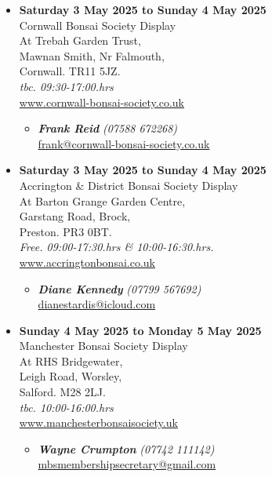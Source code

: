 \begin{itemize}
    \item \textbf{Saturday 3 May 2025 to Sunday 4 May 2025}
    \\
    Cornwall Bonsai Society Display \\
    At Trebah Garden Trust, \\
    Mawnan Smith, Nr Falmouth, \\
    Cornwall. TR11 5JZ.
    \\
    \emph{tbc. 09:30-17:00.hrs}
    \\
    \href{https://www.cornwall-bonsai-society.co.uk}{www.cornwall-bonsai-society.co.uk}
    \begin{itemize}
        \item \textbf{\emph{Frank Reid}} \emph{(07588 672268)} \\
        \href{mailto:frank@cornwall-bonsai-society.co.uk}{frank@cornwall-bonsai-society.co.uk} 
    \end{itemize}

    \item \textbf{Saturday 3 May 2025 to Sunday 4 May 2025}
    \\
    Accrington \& District Bonsai Society Display \\
    At Barton Grange Garden Centre, \\
    Garstang Road, Brock, \\
    Preston. PR3 0BT.
    \\
    \emph{Free. 09:00-17:30.hrs \& 10:00-16:30.hrs.}
    \\
    \href{https://www.accringtonbonsai.co.uk}{www.accringtonbonsai.co.uk}
    \begin{itemize}
        \item \textbf{\emph{Diane Kennedy}} \emph{(07799 567692)} \\
        \href{mailto:dianestardis@icloud.com}{dianestardis@icloud.com} 
    \end{itemize}

    \item \textbf{Sunday 4 May 2025 to Monday 5 May 2025}
    \\
    Manchester Bonsai Society Display \\
    At RHS Bridgewater, \\
    Leigh Road, Worsley, \\
    Salford. M28 2LJ.
    \\
    \emph{tbc. 10:00-16:00.hrs}
    \\
    \href{https://www.manchesterbonsaisociety.uk}{www.manchesterbonsaisociety.uk}
    \begin{itemize}
        \item \textbf{\emph{Wayne Crumpton}} \emph{(07742 111142)} \\
        \href{mailto:mbsmembershipsecretary@gmail.com}{mbsmembershipsecretary@gmail.com} 
    \end{itemize}


\end{itemize}
